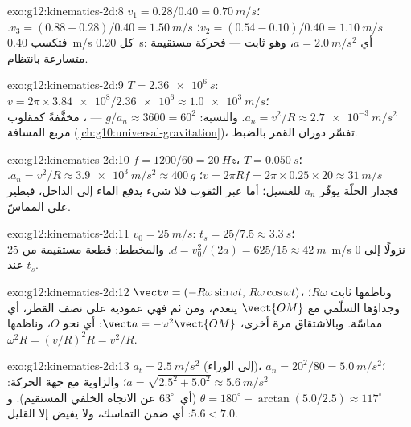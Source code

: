 \begin{solution}{exo:g12:kinematics-2d:8}
$v_1 = 0.28/0.40 = \qty{0.70}{m/s}$؛
$v_2 = (0.54 - 0.10)/0.40 = \qty{1.10}{m/s}$؛
$v_3 = (0.88 - 0.28)/0.40 = \qty{1.50}{m/s}$. فتكسب 
\qty{0.40}{m/s} كل \qty{0.20}{s}: أي $a = \qty{2.0}{m/s^2}$، وهو ثابت
--- فحركة مستقيمة متسارعة بانتظام.
\end{solution}

\begin{solution}{exo:g12:kinematics-2d:9}
$T = \qty{2.36e6}{s}$: $v = 2\pi \times \num{3.84e8}/\num{2.36e6}
\approx \qty{1.0e3}{m/s}$؛
$a_n = v^2/R \approx \qty{2.7e-3}{m/s^2}$. والنسبة:
$g/a_n \approx 3600 = 60^2$ --- ، مخفَّفةً كمقلوب
مربع المسافة (\cref{ch:g10:universal-gravitation})، تفسّر
دوران القمر بالضبط.
\end{solution}

\begin{solution}{exo:g12:kinematics-2d:10}
$f = 1200/60 = \qty{20}{Hz}$، $T = \qty{0.050}{s}$؛
$v = 2\pi R f = 2\pi \times 0.25 \times 20 \approx \qty{31}{m/s}$؛
$a_n = v^2/R \approx \qty{3.9e3}{m/s^2} \approx 400\,g$. فجدار الحلّة
يوفّر $a_n$ للغسيل؛ أما عبر الثقوب فلا شيء يدفع
الماء إلى الداخل، فيطير على المماسّ.
\end{solution}

\begin{solution}{exo:g12:kinematics-2d:11}
$v_0 = \qty{25}{m/s}$: $t_s = 25/7.5 \approx \qty{3.3}{s}$؛
$d = v_0^2/(2a) = 625/15 \approx \qty{42}{m}$. والمخطط: قطعة
مستقيمة من \qty{25}{m/s} نزولًا إلى $0$ عند $t_s$.
\end{solution}

\begin{solution}{exo:g12:kinematics-2d:12}
$\vect v = (-R\omega\sin\omega t,\, R\omega\cos\omega t)$، وناظمها
ثابت $R\omega$؛ وجداؤها السلّمي مع $\vect{OM}$ ينعدم،
ومن ثم فهي عمودية على نصف القطر، أي مماسّة. وبالاشتقاق
مرة أخرى، $\vect a = -\omega^2\vect{OM}$: أي نحو $O$، وناظمها
$\omega^2 R = (v/R)^2 R = v^2/R$.
\end{solution}

\begin{solution}{exo:g12:kinematics-2d:13}
$a_t = \qty{2.5}{m/s^2}$ (إلى الوراء)، $a_n = 20^2/80 =
\qty{5.0}{m/s^2}$؛
$a = \sqrt{2.5^2 + 5.0^2} \approx \qty{5.6}{m/s^2}$؛ والزاوية مع
جهة الحركة: $\theta = 180^\circ - \arctan(5.0/2.5) \approx 117^\circ$
(أي\ $63^\circ$ عن الاتجاه الخلفي المستقيم). و$5.6 < 7.0$: أي ضمن التماسك،
ولا يفيض إلا القليل.
\end{solution}

